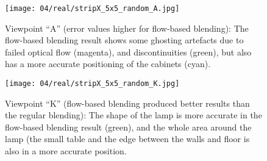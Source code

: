 \begin{figure}
  \centering
  \texttt{[image: 04/real/stripX\_5x5\_random\_A.jpg]}
  \caption[Viewpoint ``A'' in the real scene]{Viewpoint ``A'' (error values higher for flow-based blending): The flow-based blending result shows some ghosting artefacts due to failed optical flow (magenta), and discontinuities (green), but also has a more accurate positioning of the cabinets (cyan).}
	\label{fig:real_A}
\end{figure}

\begin{figure}
  \centering
  \texttt{[image: 04/real/stripX\_5x5\_random\_K.jpg]}
  \caption[Viewpoint ``K'' in the real scene]{Viewpoint ``K'' (flow-based blending produced better results than the regular blending): The shape of the lamp is more accurate in the flow-based blending result (green), and the whole area around the lamp (the small table and the edge between the walls and floor is also in a more accurate position.}
	\label{fig:real_K}
\end{figure}

